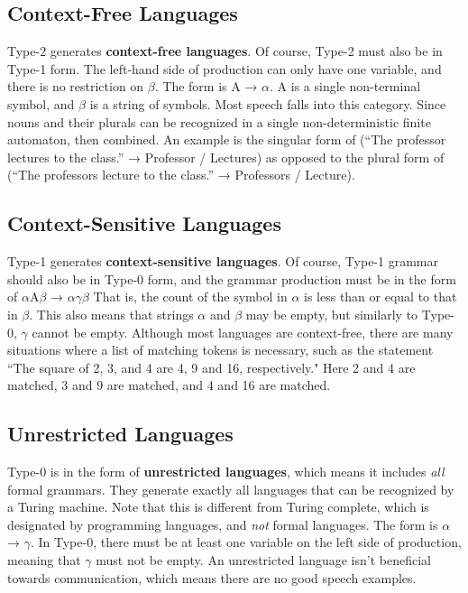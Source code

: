 \documentclass{article}
\begin{document}
\subsection{Context-Free Languages}

Type-2 generates \textbf{context-free languages}. Of course, Type-2 must also be in Type-1 form. The left-hand side of production can only have one variable, and there is no restriction on $\beta$.
The form is A → $\alpha$. A is a single non-terminal symbol, and $\beta$ is a string of symbols. Most speech falls into this category. Since nouns and their plurals can be recognized in a single
non-deterministic finite automaton, then combined. An example is the singular form of (``The professor lectures to the class.” → Professor / Lectures) as opposed to the plural form of 
(``The professors lecture to the class.” → Professors / Lecture).


\subsection{Context-Sensitive Languages}

Type-1 generates \textbf{context-sensitive languages}. Of course, Type-1 grammar should also be in Type-0 form, and the grammar production must be in the form of 
$\alpha$A$\beta$ → $\alpha$$\gamma$$\beta$ That is, the count of the symbol in $\alpha$ is less than or equal to that in $\beta$. This also means that strings $\alpha$ and $\beta$ may be empty, but similarly to 
Type-0, $\gamma$ cannot be empty. Although most languages are context-free, there are many situations where a list of matching tokens is necessary, such as the 
statement ``The square of 2, 3, and 4 are 4, 9 and 16, respectively." Here 2 and 4 are matched, 3 and 9 are matched, and 4 and 16 are matched.


\subsection{Unrestricted Languages} 

Type-0 is in the form of \textbf{unrestricted languages}, which means it includes \textit{all} formal grammars. They generate exactly all languages that can be recognized by a 
Turing machine. Note that this is different from Turing complete, which is designated by programming languages, and \textit{not} formal languages. The form is $\alpha$ → $\gamma$. 
In Type-0, there must be at least one variable on the left side of production, meaning that $\gamma$ must not be empty. An unrestricted language isn't beneficial towards 
communication, which means there are no good speech examples.
\end{document}
